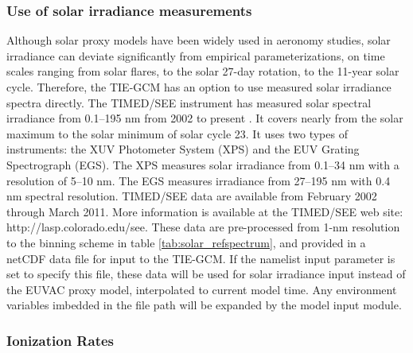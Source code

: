 \subsubsection{Use of solar irradiance measurements} 
Although solar proxy models have been widely used in aeronomy studies, 
solar irradiance can deviate significantly from empirical parameterizations,
on time scales ranging from solar flares, to the solar 27-day rotation, to 
the 11-year solar cycle.  Therefore, the TIE-GCM has an option to use measured 
solar irradiance spectra directly.  The TIMED/SEE instrument has measured solar 
spectral irradiance from 0.1--195 nm from 2002 to present \cite{Woods2005}. 
It covers nearly from the solar maximum to the solar minimum of solar cycle 23. 
It uses two types of instruments: the XUV Photometer System (XPS) and the EUV 
Grating Spectrograph (EGS). The XPS measures solar irradiance from 0.1--34 nm 
with a resolution of 5--10 nm. The EGS measures irradiance from 27--195 nm with 
0.4 nm spectral resolution. TIMED/SEE data are available from February 2002 
through March 2011. More information is available at the TIMED/SEE web site: 
http://lasp.colorado.edu/see.  These data are pre-processed from 1-nm resolution 
to the binning scheme in table \ref{tab:solar_refspectrum}, and provided in a netCDF data file for input 
to the TIE-GCM.  If the namelist input parameter  is set to specify 
this file, these data will be used for solar irradiance input instead of the 
EUVAC proxy model, interpolated to current model time.  Any environment variables 
imbedded in the file path will be expanded by the model input module. \\

%
\subsubsection{Ionization Rates}
